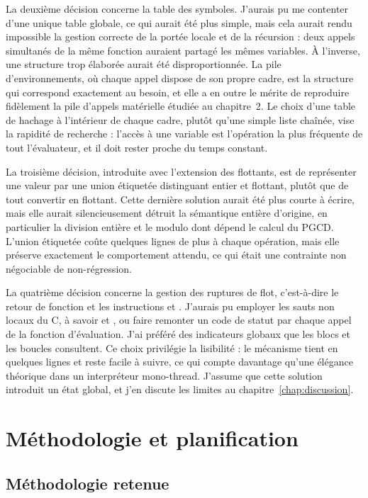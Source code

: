 La deuxième décision concerne la table des symboles. J'aurais pu me contenter
d'une unique table globale, ce qui aurait été plus simple, mais cela aurait rendu
impossible la gestion correcte de la portée locale et de la récursion : deux
appels simultanés de la même fonction auraient partagé les mêmes variables. À
l'inverse, une structure trop élaborée aurait été disproportionnée. La pile
d'environnements, où chaque appel dispose de son propre cadre, est la structure
qui correspond exactement au besoin, et elle a en outre le mérite de reproduire
fidèlement la pile d'appels matérielle étudiée au chapitre~2. Le choix d'une table
de hachage à l'intérieur de chaque cadre, plutôt qu'une simple liste chaînée, vise
la rapidité de recherche : l'accès à une variable est l'opération la plus fréquente
de tout l'évaluateur, et il doit rester proche du temps constant.

La troisième décision, introduite avec l'extension des flottants, est de
représenter une valeur par une union étiquetée distinguant entier et flottant,
plutôt que de tout convertir en flottant. Cette dernière solution aurait été plus
courte à écrire, mais elle aurait silencieusement détruit la sémantique entière
d'origine, en particulier la division entière et le modulo dont dépend le calcul
du PGCD. L'union étiquetée coûte quelques lignes de plus à chaque opération, mais
elle préserve exactement le comportement attendu, ce qui était une contrainte non
négociable de non-régression.

La quatrième décision concerne la gestion des ruptures de flot, c'est-à-dire le
retour de fonction et les instructions  et . J'aurais
pu employer les sauts non locaux du C, à savoir  et ,
ou faire remonter un code de statut par chaque appel de la fonction d'évaluation.
J'ai préféré des indicateurs globaux que les blocs et les boucles consultent. Ce
choix privilégie la lisibilité : le mécanisme tient en quelques lignes et reste
facile à suivre, ce qui compte davantage qu'une élégance théorique dans un
interpréteur mono-thread. J'assume que cette solution introduit un état global,
et j'en discute les limites au chapitre~\ref{chap:discussion}.

\section{Méthodologie et planification}

\subsection{Méthodologie retenue}

